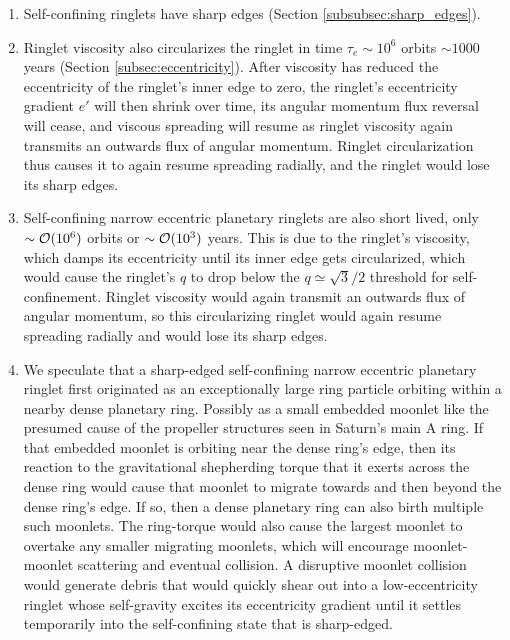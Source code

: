\documentclass[preprint]{aastex62}
\begin{document}
\begin{enumerate}
\item Self-confining ringlets have sharp edges (Section \ref{subsubsec:sharp_edges}).

\item Ringlet viscosity also circularizes the ringlet in time $\tau_e\sim10^6$ orbits $\sim1000$ years
(Section \ref{subsec:eccentricity}). After viscosity has reduced the eccentricity of the ringlet's 
inner edge to zero, the ringlet's  eccentricity gradient $e'$ will then shrink over time, its
angular momentum flux reversal will cease, and viscous spreading will resume as ringlet 
viscosity again transmits an  outwards flux of angular momentum. Ringlet circularization thus causes 
it to again resume spreading radially, and the ringlet would lose its sharp edges.

\item Self-confining narrow eccentric planetary ringlets are also short lived,
only $\sim{\cal O}(10^6)$ orbits or $\sim{\cal O}(10^3)$ years. This is due to the ringlet's viscosity, which damps its 
eccentricity until its inner edge gets circularized, which would cause the ringlet's 
$q$ to drop below the $q\simeq\sqrt{3}/2$ threshold for self-confinement. Ringlet viscosity would
again transmit an  outwards flux of angular momentum, so this circularizing ringlet would 
again resume spreading radially and would lose its sharp edges.

\item We speculate that a sharp-edged self-confining narrow eccentric planetary ringlet first originated as
an exceptionally large ring particle orbiting within a nearby dense planetary ring. 
Possibly as a small embedded moonlet like the presumed cause of the propeller structures
seen in Saturn's main A ring. If that embedded moonlet is orbiting near the dense ring's edge, then
its reaction to the gravitational shepherding torque that it exerts across the dense ring would
cause that moonlet to migrate towards and then beyond the dense ring's edge. If so, then 
a dense planetary ring can also birth multiple such moonlets. The ring-torque would also 
cause the largest moonlet to overtake any smaller migrating moonlets, which will encourage
moonlet-moonlet scattering and eventual collision. A disruptive moonlet collision
would generate debris that would quickly
shear out into a low-eccentricity ringlet whose self-gravity excites its eccentricity gradient
until it settles temporarily into the self-confining state that is sharp-edged.



\end{enumerate}
\end{document}
